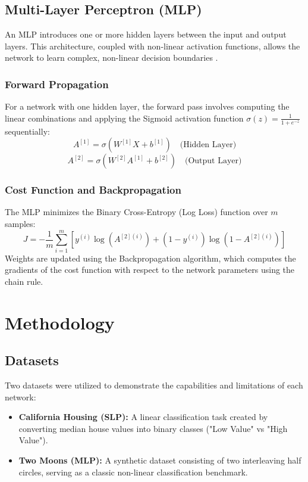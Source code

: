 \documentclass[11pt]{article}
\begin{document}
\subsection{Multi-Layer Perceptron (MLP)}
An MLP introduces one or more hidden layers between the input and output layers. This architecture, coupled with non-linear activation functions, allows the network to learn complex, non-linear decision boundaries \cite{goodfellow2016deep}.

\subsubsection*{Forward Propagation}
For a network with one hidden layer, the forward pass involves computing the linear combinations and applying the Sigmoid activation function $\sigma(z) = \frac{1}{1 + e^{-z}}$ sequentially:
\begin{equation}
    A^{[1]} = \sigma(W^{[1]} X + b^{[1]}) \quad \text{(Hidden Layer)}
\end{equation}
\begin{equation}
    A^{[2]} = \sigma(W^{[2]} A^{[1]} + b^{[2]}) \quad \text{(Output Layer)}
\end{equation}

\subsubsection*{Cost Function and Backpropagation}
The MLP minimizes the Binary Cross-Entropy (Log Loss) function over $m$ samples:
\begin{equation}
    J = -\frac{1}{m} \sum_{i=1}^{m} \left[ y^{(i)} \log(A^{[2](i)}) + (1 - y^{(i)}) \log(1 - A^{[2](i)}) \right]
\end{equation}
Weights are updated using the Backpropagation algorithm, which computes the gradients of the cost function with respect to the network parameters using the chain rule.

\section{Methodology}

\subsection{Datasets}
Two datasets were utilized to demonstrate the capabilities and limitations of each network:
\begin{itemize}
    \item \textbf{California Housing (SLP):} A linear classification task created by converting median house values into binary classes ("Low Value" vs "High Value").
    \item \textbf{Two Moons (MLP):} A synthetic dataset consisting of two interleaving half circles, serving as a classic non-linear classification benchmark.
\end{itemize}
\end{document}
